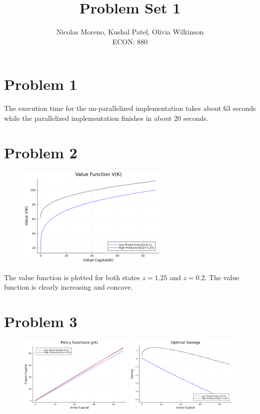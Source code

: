 \documentclass[10pt]{article}
\begin{document}
 
\title{Problem Set 1}
\author{Nicolas Moreno, Kushal Patel, Olivia Wilkinson \\
ECON: 880}
\maketitle

\section{Problem 1}

The execution time for the un-parallelized implementation takes about 63 seconds while the parallelized implementation finishes in about 20 seconds. 

\section{Problem 2}
\begin{figure}[!h]
    \centering
    \includegraphics[width = 0.65\textwidth]{Value_Functions.png}
\end{figure}

The value function is plotted for both states $z = 1.25$ and $z = 0.2$. The value function is clearly increasing and concave. 

\newpage 
\section{Problem 3}
\begin{figure}[!h]
    \centering
    \includegraphics[width = 0.49\textwidth]{Policy_Functions.png}
    \includegraphics[width = 0.49\textwidth]{Policy_Functions_Changes.png}

\end{figure}
\end{document}
